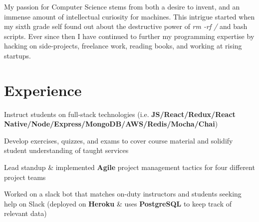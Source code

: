 \documentclass[letterpaper]{deedy-resume} %
\begin{document}
\begin{minipage}[t]{0.66\textwidth} %


  My passion for Computer Science stems from both a desire to invent,
  and an immense amount of intellectual curiosity for machines. This
  intrigue started when my sixth grade self found
  out about the destructive power of {\it rm -rf /} and bash scripts.
  Ever since then I have continued to further my programming
  expertise by hacking on side-projects, freelance work,
  reading books, and working at rising startups.
  


  \section{Experience}



  \begin{tightitemize}
  \item Instruct students on full-stack technologies (i.e. \textbf{JS/React/Redux/React Native/Node/Express/MongoDB/AWS/Redis/Mocha/Chai})
  \item Develop exercises, quizzes, and exams to cover course material and solidify student understanding of taught services
  \item Lead standup \& implemented \textbf{Agile} project management tactics for four different project teams
  \item Worked on a slack bot that matches on-duty instructors and students seeking help on Slack (deployed on \textbf{Heroku} \& uses \textbf{PostgreSQL} to keep track of relevant data)
  \end{tightitemize}

  \sectionspace %



\end{minipage}
\end{document}
